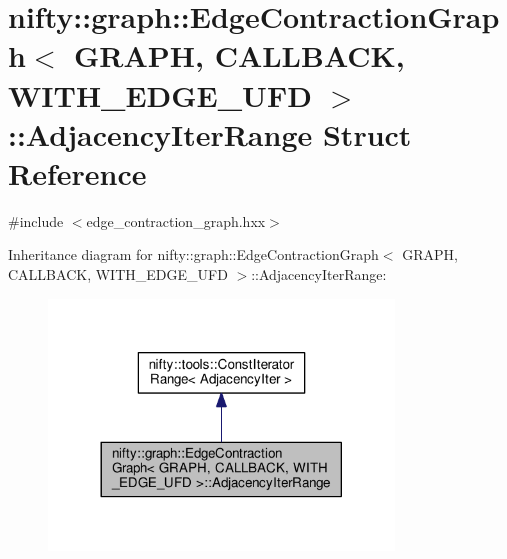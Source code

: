 \hypertarget{structnifty_1_1graph_1_1EdgeContractionGraph_1_1AdjacencyIterRange}{}\section{nifty\+:\+:graph\+:\+:Edge\+Contraction\+Graph$<$ G\+R\+A\+P\+H, C\+A\+L\+L\+B\+A\+C\+K, W\+I\+T\+H\+\_\+\+E\+D\+G\+E\+\_\+\+U\+F\+D $>$\+:\+:Adjacency\+Iter\+Range Struct Reference}
\label{structnifty_1_1graph_1_1EdgeContractionGraph_1_1AdjacencyIterRange}


{\ttfamily \#include $<$edge\+\_\+contraction\+\_\+graph.\+hxx$>$}



Inheritance diagram for nifty\+:\+:graph\+:\+:Edge\+Contraction\+Graph$<$ G\+R\+A\+P\+H, C\+A\+L\+L\+B\+A\+C\+K, W\+I\+T\+H\+\_\+\+E\+D\+G\+E\+\_\+\+U\+F\+D $>$\+:\+:Adjacency\+Iter\+Range\+:\nopagebreak
\begin{figure}[H]
\begin{center}
\leavevmode
\includegraphics[width=260pt]{structnifty_1_1graph_1_1EdgeContractionGraph_1_1AdjacencyIterRange__inherit__graph}
\end{center}
\end{figure}


